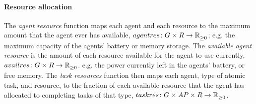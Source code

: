 \paragraph{Resource allocation}
\newcommand{\functionAgentResourcesSymbol}[2]{
	\functionSymbol{agentres}
}
\newcommand{\formalAgentResources}[2]{
	\functionFormal{\functionAgentResourcesSymbol{}{}}
	{\setAgents{}{} \times \setResource{}{}}
	{\setRealNumbersNonNegative{}{}}
}
\newcommand{\functionAgentResources}[2]{
	\functionSignature{\functionAgentResourcesSymbol{}{}}{\varAgent{#1}{}, \varResource{#2}{}}
}
\newcommand{\functionAgentResourcesEnergy}[2]{
	\functionSignature{\functionAgentResourcesSymbol{}{}}{\varAgent{}{}, \varResource{e}{}}
}
\newcommand{\functionAgentAvailableResourcesSymbol}[2]{
	\functionSymbol{availres}{#1}{#2}
}
\newcommand{\formalAgentAvailableResources}[2]{
	\functionFormal{\functionAgentAvailableResourcesSymbol{}{}}
	{\setAgents{}{} \times \setResource{}{}}
	{\setRealNumbersNonNegative{}{}}
}
\newcommand{\functionAgentAvailableResources}[2]{
	\functionSignature{\functionAgentAvailableResourcesSymbol{}{}}
	{\varAgent{#1}{}, \varResource{#2}{}}
}

\newcommand{\functionTaskPathEnergyAvailable}[2]{
	\functionSignature{\functionResourceAvailableSymbol{}{}}
	{\functionTaskArc{}{}, \varResourceEnergy{}{}}
}
\newcommand{\functionTaskResourceAllocationSymbol}[2]{
	\functionSymbol{taskres}{#1}{#2}
}
\newcommand{\formalTaskResourceAllocation}[2]{
	\functionFormal{\functionTaskResourceAllocationSymbol{}{}}
	{\setAgents{}{} \times \setAtomicTaskType{}{} \times \setResource{}{} }
	{\setRealNumbersNonNegative{}{}}
}
\newcommand{\functionTaskResourceAllocation}[2]{
	\functionSignature{\functionTaskResourceAllocationSymbol{}{}}
	{\varAgent{}{}, \varAtomicTaskType{}{}, \varResource{}{}}
}
\newcommand{\functionTaskResourceAllocationInstance}[2]{
	\functionSignature{\functionTaskResourceAllocationSymbol{}{}}
	{\varAgent{}{}, \functionAtomicTaskMapping{\varAtomicTask{}{}}{}, \varResource{}{}}
}

The \textit{agent resource} function maps each agent and each resource to the maximum amount that the agent ever has available, $\formalAgentResources{}{}$; e.g. the maximum capacity of the agents' battery or memory storage. 
The \textit{available agent resource} is the amount of each resource available for the agent to use currently, $\formalAgentAvailableResources{}{}$. e.g. the power currently left in the agents' battery, or free memory. The \textit{task resources} function then maps each agent, type of atomic task, and resource, to the fraction of each available resource that the agent has allocated to completing tasks of that type, $\formalTaskResourceAllocation{}{}$.

